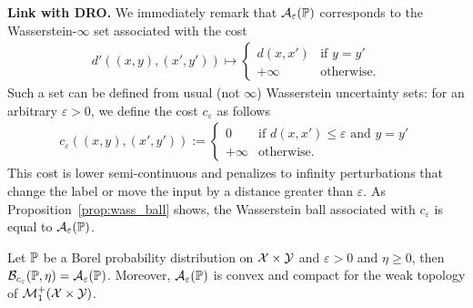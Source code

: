 \textbf{Link with DRO.} We immediately remark that $\mathcal{A}_\varepsilon(\mathbb{P})$ corresponds to the Wasserstein-$\infty$ set associated with
the cost
\begin{align*}
    d'((x,y),(x',y'))\mapsto \left\{
        \begin{array}{ll}
            d(x,x') & \mbox{if } y = y'\\
            +\infty & \mbox{otherwise.}
        \end{array}
    \right.
\end{align*}
Such a set can be defined from usual (not $\infty$) Wasserstein uncertainty sets:  for an arbitrary $\varepsilon>0$, we define the cost $c_\varepsilon$ as follows
\begin{align*}
c_\varepsilon((x,y),(x',y')) := \left\{
    \begin{array}{ll}
        0 & \mbox{if } d(x,x')\leq\varepsilon\mbox{ and }y = y'\\
        +\infty & \mbox{otherwise.}
    \end{array}
\right.
\end{align*}
This cost is lower semi-continuous and penalizes to infinity perturbations that change the label or move the input by a distance greater than $\varepsilon$. As Proposition~\ref{prop:wass_ball} shows, the Wasserstein ball associated with $c_\varepsilon$ is equal to $\mathcal{A}_{\varepsilon}(\mathbb{P})$.
\begin{prop}
\label{prop:wass_ball}
Let $\mathbb{P}$ be a Borel probability distribution on $\mathcal{X}\times\mathcal{Y}$ and $\varepsilon>0$ and $\eta\geq 0$, then
    $\mathcal{B}_{c_\varepsilon}(\mathbb{P},\eta) =\mathcal{A}_{\varepsilon}(\mathbb{P})$.
Moreover, $\mathcal{A}_{\varepsilon}(\mathbb{P})$ is convex and compact for the weak topology of $\mathcal{M}^+_1(\mathcal{X}\times\mathcal{Y})$.
\end{prop}
